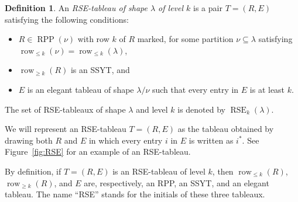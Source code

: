 \documentclass{amsart}
\numberwithin{equation}{section}
\theoremstyle{definition}
\newtheorem{defn}[thm]{Definition}
\newcommand\row{\operatorname{row}}
\newcommand\RSE{\operatorname{RSE}}
\newcommand\RPP{\operatorname{RPP}}
\begin{document}
\begin{defn}
An \emph{RSE-tableau of shape $\lambda$ of level $k$} is a pair $T=(R,E)$ satisfying
the following conditions:
\begin{itemize}
\item $R\in\RPP(\nu)$ with row $k$ of $R$ marked, for some partition
  $\nu\subseteq\lambda$ satisfying $\row_{\le k}(\nu)=\row_{\le k}(\lambda)$,
\item $\row_{\ge k}(R)$ is an SSYT, and
\item $E$ is an elegant tableau of shape $\lambda/\nu$
  such that every entry in $E$ is at least $k$.
\end{itemize}
The set of RSE-tableaux of shape $\lambda$ and level $k$ is denoted by
$\RSE_k(\lambda)$.
\end{defn}

We will represent an RSE-tableau $T=(R,E)$ as the tableau obtained by drawing
both $R$ and $E$ in which every entry $i$ in $E$ is written as $i^*$. See
Figure~\ref{fig:RSE} for an example of an RSE-tableau. 

By definition, if $T=(R,E)$ is an RSE-tableau of level $k$, then $\row_{\le
  k}(R)$, $\row_{\ge k}(R)$, and $E$ are, respectively, an RPP, an SSYT, and an
elegant tableau. The name ``RSE'' stands for the initials of these three
tableaux.
\end{document}
